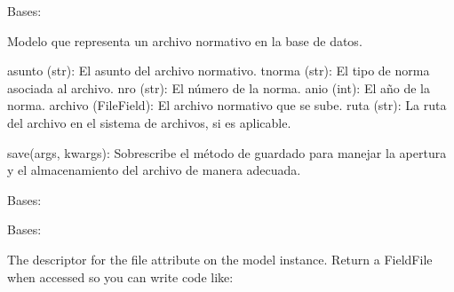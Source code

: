 \documentclass[letterpaper,10pt,spanish]{sphinxmanual}
\begin{document}
\begin{fulllineitems}

\pysigstartsignatures
{}
\pysigstopsignatures
\sphinxAtStartPar
Bases: 

\sphinxAtStartPar
Modelo que representa un archivo normativo en la base de datos.
\begin{description}
\sphinxAtStartPar
asunto (str): El asunto del archivo normativo.
tnorma (str): El tipo de norma asociada al archivo.
nro (str): El número de la norma.
anio (int): El año de la norma.
archivo (FileField): El archivo normativo que se sube.
ruta (str): La ruta del archivo en el sistema de archivos, si es aplicable.

\sphinxAtStartPar
save(args, kwargs): Sobrescribe el método de guardado para manejar la apertura y el almacenamiento del archivo de manera adecuada.

\end{description}


\begin{fulllineitems}

\pysigstartsignatures
{}
\pysigstopsignatures
\sphinxAtStartPar
Bases: 

\end{fulllineitems}



\begin{fulllineitems}

\pysigstartsignatures
{}
\pysigstopsignatures
\sphinxAtStartPar
Bases: 

\end{fulllineitems}



\begin{fulllineitems}

\pysigstartsignatures
{}
\pysigstopsignatures
\sphinxAtStartPar
The descriptor for the file attribute on the model instance. Return a
FieldFile when accessed so you can write code like:


\end{fulllineitems}
\end{fulllineitems}
\end{document}

